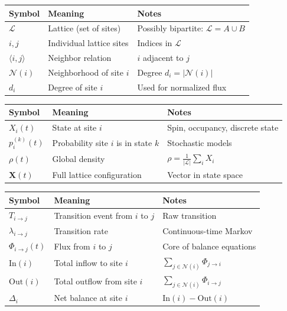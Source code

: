 
\begin{table}[h!]
\centering
\renewcommand{\arraystretch}{1.25}

\begin{tabular}{lll}
\hline
\textbf{Symbol} & \textbf{Meaning} & \textbf{Notes} \\
\hline
$\mathcal{L}$ & Lattice (set of sites) & Possibly bipartite: $\mathcal{L}=A\cup B$ \\
$i,j$ & Individual lattice sites & Indices in $\mathcal{L}$ \\
$\langle i,j\rangle$ & Neighbor relation & $i$ adjacent to $j$ \\
$\mathcal{N}(i)$ & Neighborhood of site $i$ & Degree $d_i = |\mathcal{N}(i)|$ \\
$d_i$ & Degree of site $i$ & Used for normalized flux \\
\hline
\end{tabular}

\vspace{1em}

\begin{tabular}{lll}
\hline
\textbf{Symbol} & \textbf{Meaning} & \textbf{Notes} \\
\hline
$X_i(t)$ & State at site $i$ & Spin, occupancy, discrete state \\
$p_i^{(k)}(t)$ & Probability site $i$ is in state $k$ & Stochastic models \\
$\rho(t)$ & Global density & $\rho = \frac{1}{|\mathcal{L}|}\sum_i X_i$ \\
$\mathbf{X}(t)$ & Full lattice configuration & Vector in state space \\
\hline
\end{tabular}

\vspace{1em}

\begin{tabular}{lll}
\hline
\textbf{Symbol} & \textbf{Meaning} & \textbf{Notes} \\
\hline
$T_{i\to j}$ & Transition event from $i$ to $j$ & Raw transition \\
$\lambda_{i\to j}$ & Transition rate & Continuous-time Markov \\
$\Phi_{i\to j}(t)$ & Flux from $i$ to $j$ & Core of balance equations \\
$\mathrm{In}(i)$ & Total inflow to site $i$ & $\sum_{j\in\mathcal{N}(i)} \Phi_{j\to i}$ \\
$\mathrm{Out}(i)$ & Total outflow from site $i$ & $\sum_{j\in\mathcal{N}(i)} \Phi_{i\to j}$ \\
$\Delta_i$ & Net balance at site $i$ & $\mathrm{In}(i)-\mathrm{Out}(i)$ \\
\hline
\end{tabular}


\end{table}
